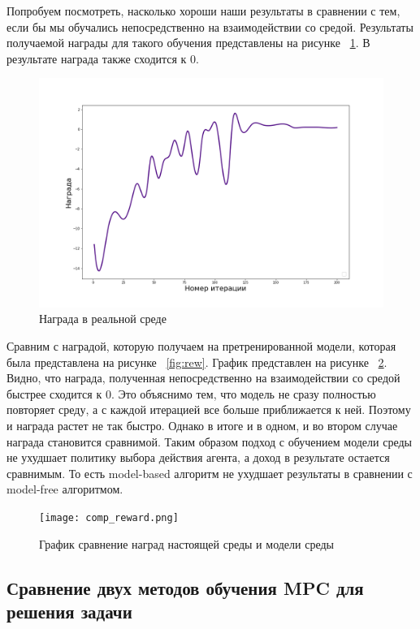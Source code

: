 Попробуем посмотреть, насколько хороши наши результаты в сравнении с тем, если бы мы обучались непосредственно на взаимодействии со средой. Результаты получаемой награды для такого обучения представлены на рисунке ~\ref{fig:true-rew}. В результате награда также сходится к 0.


\begin{figure}[!h]
	\centering
	\includegraphics[scale=0.5]{true_reward.png}
	\caption {Награда в реальной среде}
	\label{fig:true-rew}
\end{figure}

Сравним с наградой, которую получаем на претренированной модели, которая была представлена на рисунке ~\ref{fig:rew}. График представлен на рисунке ~\ref{fig:comp-rew}. Видно, что награда, полученная непосредственно на взаимодействии со средой быстрее сходится к 0. Это объяснимо тем, что модель не сразу полностью повторяет среду, а с каждой итерацией все больше приближается к ней. Поэтому и награда растет не так быстро. Однако в итоге и в одном, и во втором случае награда становится сравнимой. Таким образом подход с обучением модели среды не ухудшает политику выбора действия агента, а доход в результате остается сравнимым. То есть model-based алгоритм не ухудшает результаты в сравнении с model-free алгоритмом. \newpage


\begin{figure}[!h]
	\centering
	\texttt{[image: comp\_reward.png]}
	\caption {График сравнение наград настоящей среды и модели среды}
	\label{fig:comp-rew}
\end{figure}


\subsection{Сравнение двух методов обучения MPC для решения задачи  }\label{1sec:optimal-control}


